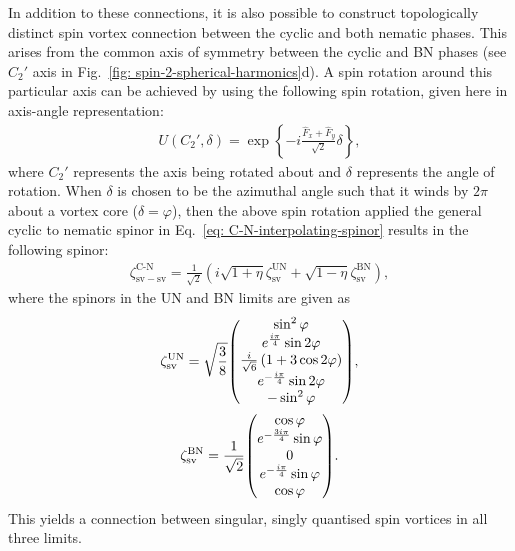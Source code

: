 In addition to these connections, it is also possible to construct topologically
distinct spin vortex connection between the cyclic and both nematic phases.
This arises from the common axis of symmetry between the cyclic and BN phases
(see \(C_2'\) axis in Fig.~\ref{fig: spin-2-spherical-harmonics}d).
A spin rotation around this particular axis can be achieved by using the
following spin rotation, given here in axis-angle representation:
\begin{align}
    U(C_2', \delta) = \exp\left\{
        -i\frac{\hat{F}_x + \hat{F}_y}{\sqrt{2}}\delta
    \right\},
\end{align}
where \(C_2'\) represents the axis being rotated about and \(\delta\) represents
the angle of rotation.
When \(\delta\) is chosen to be the azimuthal angle such that it winds by
\(2\pi \) about a vortex core (\(\delta=\varphi\)), then the above spin rotation
applied the general cyclic to nematic spinor in
Eq.~\eqref{eq: C-N-interpolating-spinor} results in the following spinor:
\begin{align}
    \zeta^\text{C-N}_\mathrm{sv-sv} = \frac{1}{\sqrt{2}}\left(
    i\sqrt{1+\eta}\zeta^\mathrm{UN}_\mathrm{sv} +
    \sqrt{1-\eta}\zeta^\mathrm{BN}_\mathrm{sv}
    \right), \label{eq: C-BN-sv-sv}
\end{align}
where the spinors in the UN and BN limits are given as
\begin{gather}
    \zeta^\mathrm{UN}_\mathrm{sv} = \sqrt{\frac{3}{8}}
    \mqty(
    \sin^2 \varphi \\
    e^{\frac{i\pi }{4}} \sin 2\varphi \\
    \frac{i}{\sqrt{6}}\left(1 + 3\cos 2\varphi \right)\\
    e^{-\frac{i \pi }{4}} \sin2 \varphi \\
    -\sin^2 \varphi
    ), \\
    \zeta^\mathrm{BN}_\mathrm{sv} = \frac{1}{\sqrt{2}}
    \mqty(
    \cos \varphi \\
    e^{-\frac{3i\pi }{4}} \sin \varphi \\
    0\\
    e^{-\frac{i \pi }{4}} \sin \varphi \\
    \cos \varphi
    ).
\end{gather}
This yields a connection between singular, singly quantised spin vortices in all
three limits.

